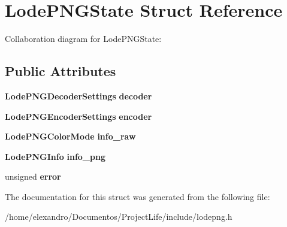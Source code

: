 \section{Lode\+P\+N\+G\+State Struct Reference}
\label{struct_lode_p_n_g_state}


Collaboration diagram for Lode\+P\+N\+G\+State\+:
\subsection*{Public Attributes}
\begin{DoxyCompactItemize}
\item 
\mbox{\label{struct_lode_p_n_g_state_abd2c38ffc68f04b0e4159e1f97ba1f76}} 
\textbf{ Lode\+P\+N\+G\+Decoder\+Settings} {\bfseries decoder}
\item 
\mbox{\label{struct_lode_p_n_g_state_ac63d91db835129d02eb83bbe81de347e}} 
\textbf{ Lode\+P\+N\+G\+Encoder\+Settings} {\bfseries encoder}
\item 
\mbox{\label{struct_lode_p_n_g_state_a597bc08de787147474d43adf8b6ceacf}} 
\textbf{ Lode\+P\+N\+G\+Color\+Mode} {\bfseries info\+\_\+raw}
\item 
\mbox{\label{struct_lode_p_n_g_state_a08d9ac43c995fcf34d72b1d37047b6fa}} 
\textbf{ Lode\+P\+N\+G\+Info} {\bfseries info\+\_\+png}
\item 
\mbox{\label{struct_lode_p_n_g_state_a1a00a050da588cf3c2b7a6252bebb0cd}} 
unsigned {\bfseries error}
\end{DoxyCompactItemize}


The documentation for this struct was generated from the following file\+:\begin{DoxyCompactItemize}
\item 
/home/elexandro/\+Documentos/\+Project\+Life/include/lodepng.\+h\end{DoxyCompactItemize}
